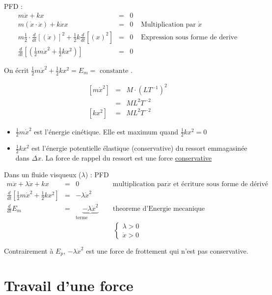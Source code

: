 PFD : \[
	\begin{array}{rclr}
		m\ddot{x} + kx &=& 0\\
		m(\dot{x}\cdot \ddot{x}) + k\dot{x}x &=& 0  & \text{ Multiplication par } \dot{x} \\
		m \frac{1}{2} \cdot \frac{d}{dt}[(\dot{x})]^2 + \frac{1}{2}k\frac{d}{dt}[(x)^2] &=& 0 & \text{ Expression sous forme de derive}\\
		\frac{d}{dt}[(\frac{1}{2}m\dot{x}^2 + \frac{1}{2}kx^2)] &=& 0
\end{array}\]

On écrit $\frac{1}{2}m\dot{x}^2 + \frac{1}{2}kx^2 = E_m = \text{ constante }$.

\[
	\begin{array}{rcl}
		{[m\dot{x}^2]} &=& M\cdot(LT^{-1})^2 \\
							  &=& ML^2T^{-2} \\
		{[kx^2]} &=& ML^2T^{-2}
	\end{array}
\]

\begin{itemize}
	\item $\frac{1}{2}m\dot{x}^2$ est l'énergie cinétique. Elle est maximum quand $\frac{1}{2}kx^2 = 0$
	\item $\frac{1}{2}kx^2$ est l'énergie potentielle élastique (conservative) du ressort emmagasinée dans $\Delta x$. La force de rappel du ressort est une force \ul{conservative}
\end{itemize}

Dans un fluide visqueux ($\lambda$) : PFD\[
	\begin{array}{rclr}
		m\ddot{x} + \lambda \dot{x} + kx &=& 0 & \text{ multiplication par} \dot{x} \text{ et écriture sous forme de dérivé} \\
		\frac{d}{dt}[\frac{1}{2}m\dot{x}^2 + \frac{1}{2}kx^2] &=& -\lambda \dot{x}^2 \\
		\frac{d}{dt}E_m &=& \underbrace{-\lambda\dot{x}^2}_{\text{terme dissipatif}} & \text{ theoreme d'Energie mecanique }
	\end{array}
\]
\[
	\left\{
		\begin{array}{c}
			\lambda > 0 \\
			\dot{x} > 0
	\end{array}\right.\]

	Contrairement à $E_p$, $-\lambda \dot{x}^2$ est une force de frottement qui n'est pas conservative.

\section{Travail d'une force}

